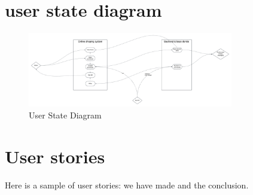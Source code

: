 \documentclass{article}
\begin{document}
\section{user state diagram}

\begin{figure}[H]
    \centering
    \includegraphics[width=0.8\textwidth]{images/user_state_diagram.png}
    \caption{User State Diagram}
    \label{fig:user_state_diagram}
\end{figure}

\section{User stories}

Here is a sample of user stories: we have made and the conclusion.
\end{document}
